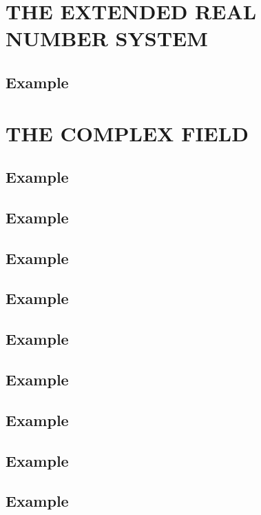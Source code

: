 \section*{THE EXTENDED REAL NUMBER SYSTEM}
\subsection*{\textbf{Example}}
\label{sec:23}



\section{THE COMPLEX FIELD}

\subsection*{\textbf{Example}}
\label{sec:24}

\subsection*{\textbf{Example}}
\label{sec:25}


\subsection*{\textbf{Example}}
\label{sec:26}

\subsection*{\textbf{Example}}
\label{sec:27}
\subsection*{\textbf{Example}}
\label{sec:28}
\subsection*{\textbf{Example}}
\label{sec:29}
\subsection*{\textbf{Example}}
\label{sec:30}
\subsection*{\textbf{Example}}
\label{sec:31}
\subsection*{\textbf{Example}}
\label{sec:32}
